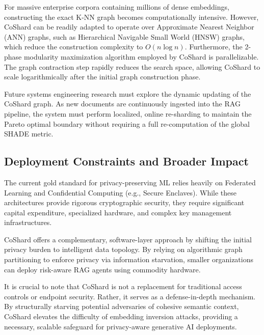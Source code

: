 For massive enterprise corpora containing millions of dense embeddings, constructing the exact K-NN graph becomes computationally intensive. However, CoShard can be readily adapted to operate over Approximate Nearest Neighbor (ANN) graphs, such as Hierarchical Navigable Small World (HNSW) graphs, which reduce the construction complexity to $O(n \log n)$. Furthermore, the 2-phase modularity maximization algorithm employed by CoShard is parallelizable. The graph contraction step rapidly reduces the search space, allowing CoShard to scale logarithmically after the initial graph construction phase. 

Future systems engineering research must explore the dynamic updating of the CoShard graph. As new documents are continuously ingested into the RAG pipeline, the system must perform localized, online re-sharding to maintain the Pareto optimal boundary without requiring a full re-computation of the global SHADE metric.

\subsection{Deployment Constraints and Broader Impact}
The current gold standard for privacy-preserving ML relies heavily on Federated Learning and Confidential Computing (e.g., Secure Enclaves). While these architectures provide rigorous cryptographic security, they require significant capital expenditure, specialized hardware, and complex key management infrastructures.

CoShard offers a complementary, software-layer approach by shifting the initial privacy burden to intelligent data topology. By relying on algorithmic graph partitioning to enforce privacy via information starvation, smaller organizations can deploy risk-aware RAG agents using commodity hardware. 

It is crucial to note that CoShard is not a replacement for traditional access controls or endpoint security. Rather, it serves as a defense-in-depth mechanism. By structurally starving potential adversaries of cohesive semantic context, CoShard elevates the difficulty of embedding inversion attacks, providing a necessary, scalable safeguard for privacy-aware generative AI deployments.

